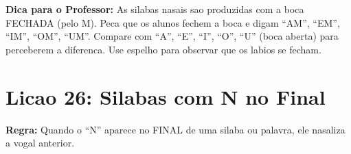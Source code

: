 \begin{dica}
\textbf{Dica para o Professor:} As silabas nasais sao produzidas com a boca FECHADA (pelo M). Peca que os alunos fechem a boca e digam ``AM'', ``EM'', ``IM'', ``OM'', ``UM''. Compare com ``A'', ``E'', ``I'', ``O'', ``U'' (boca aberta) para perceberem a diferenca. Use espelho para observar que os labios se fecham.
\end{dica}

\section{Licao 26: Silabas com N no Final}

\rotinasimples
{}



\textbf{Regra:} Quando o ``N'' aparece no FINAL de uma silaba ou palavra, ele nasaliza a vogal anterior.

